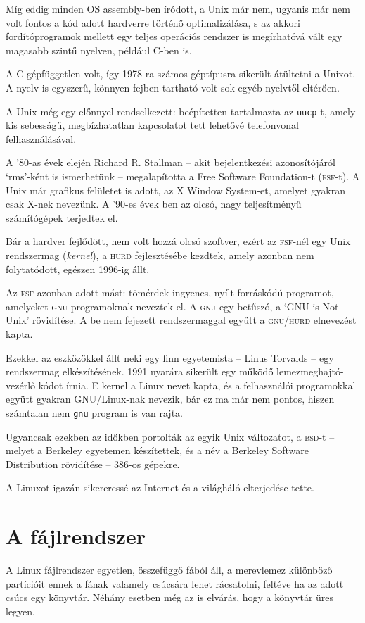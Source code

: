 Míg eddig minden OS assembly-ben íródott, a Unix már nem, ugyanis már nem volt
fontos a kód adott hardverre történő optimalizálása, s az akkori
fordítóprogramok mellett egy teljes operációs rendszer is megírhatóvá vált egy
magasabb szintű nyelven, például C-ben is.

A C gépfüggetlen volt, így 1978-ra számos géptípusra sikerült átültetni a
Unixot. A nyelv is egyszerű, könnyen fejben tartható volt sok egyéb nyelvtől
eltérően.

A Unix még egy előnnyel rendselkezett: beépítetten tartalmazta az
\texttt{uucp}-t, amely kis sebesságű, megbízhatatlan kapcsolatot tett lehetővé
telefonvonal felhasználásával.

A '80-as évek elején Richard R. Stallman -- akit bejelentkezési azonosítójáról
`rms'-ként is ismerhetünk -- megalapította a Free Software Foundation-t
(\textsc{fsf}-t). A Unix már grafikus felületet is adott, az X Window System-et,
amelyet gyakran csak X-nek nevezünk. A '90-es évek ben az olcsó, nagy
teljesítményű számítógépek terjedtek el.

Bár a hardver fejlődött, nem volt hozzá olcsó szoftver, ezért az
\textsc{fsf}-nél egy Unix rendszermag (\emph{kernel}), a \textsc{hurd}
fejlesztésébe kezdtek, amely azonban nem folytatódott, egészen 1996-ig állt.

Az \textsc{fsf} azonban adott mást: tömérdek ingyenes, nyílt forráskódú
programot, amelyeket \textsc{gnu} programoknak neveztek el. A \textsc{gnu} egy
betűszó, a `\textsc{GNU} is Not Unix' rövidítése. A be nem fejezett
rendszermaggal együtt a \textsc{gnu/hurd} elnevezést kapta.

Ezekkel az eszközökkel állt neki egy finn egyetemista -- Linus Torvalds -- egy
rendszermag elkészítésének. 1991 nyarára sikerült egy működő
lemezmeghajtó-vezérlő kódot írnia. E kernel a Linux nevet kapta, és a
felhasználói programokkal együtt gyakran  GNU/Linux-nak nevezik, bár ez ma már
nem pontos, hiszen számtalan nem \texttt{gnu} program is van rajta.

Ugyancsak ezekben az időkben portolták az egyik Unix változatot, a
\textsc{bsd}-t -- melyet a Berkeley egyetemen készítettek, és a név a Berkeley
Software Distribution rövidítése -- 386-os gépekre.

A Linuxot igazán sikereressé az Internet és a világháló elterjedése tette.

\section{A fájlrendszer}
A Linux fájlrendszer egyetlen, összefüggő fából áll, a merevlemez különböző
partícióit ennek a fának valamely csúcsára lehet rácsatolni, feltéve ha az adott
csúcs egy könyvtár. Néhány esetben még az is elvárás, hogy a könyvtár üres
legyen. 

